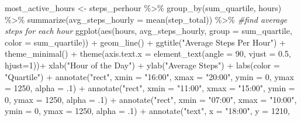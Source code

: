 \documentclass[
]{article}
\newenvironment{Shaded}{\begin{snugshade}}{\end{snugshade}}
\newcommand{\AttributeTok}[1]{\textcolor[rgb]{0.77,0.63,0.00}{#1}}
\newcommand{\CommentTok}[1]{\textcolor[rgb]{0.56,0.35,0.01}{\textit{#1}}}
\newcommand{\DecValTok}[1]{\textcolor[rgb]{0.00,0.00,0.81}{#1}}
\newcommand{\FloatTok}[1]{\textcolor[rgb]{0.00,0.00,0.81}{#1}}
\newcommand{\FunctionTok}[1]{\textcolor[rgb]{0.00,0.00,0.00}{#1}}
\newcommand{\NormalTok}[1]{#1}
\newcommand{\OtherTok}[1]{\textcolor[rgb]{0.56,0.35,0.01}{#1}}
\newcommand{\SpecialCharTok}[1]{\textcolor[rgb]{0.00,0.00,0.00}{#1}}
\newcommand{\StringTok}[1]{\textcolor[rgb]{0.31,0.60,0.02}{#1}}
\begin{document}
\begin{Shaded}
\begin{Highlighting}[]
\NormalTok{ most\_active\_hours }\OtherTok{\textless{}{-}}\NormalTok{  steps\_perhour }\SpecialCharTok{\%\textgreater{}\%}
   \FunctionTok{group\_by}\NormalTok{(sum\_quartile, hours) }\SpecialCharTok{\%\textgreater{}\%}
   \FunctionTok{summarize}\NormalTok{(}\AttributeTok{avg\_steps\_hourly =} \FunctionTok{mean}\NormalTok{(step\_total)) }\SpecialCharTok{\%\textgreater{}\%} \CommentTok{\#find average steps for each hour}
   \FunctionTok{ggplot}\NormalTok{(}\FunctionTok{aes}\NormalTok{(hours, avg\_steps\_hourly, }\AttributeTok{group =}\NormalTok{ sum\_quartile, }\AttributeTok{color =}\NormalTok{ sum\_quartile)) }\SpecialCharTok{+}
   \FunctionTok{geom\_line}\NormalTok{() }\SpecialCharTok{+}
   \FunctionTok{ggtitle}\NormalTok{(}\StringTok{"Average Steps Per Hour"}\NormalTok{) }\SpecialCharTok{+}
   \FunctionTok{theme\_minimal}\NormalTok{() }\SpecialCharTok{+}
   \FunctionTok{theme}\NormalTok{(}\AttributeTok{axis.text.x =} \FunctionTok{element\_text}\NormalTok{(}\AttributeTok{angle =} \DecValTok{90}\NormalTok{, }\AttributeTok{vjust =} \FloatTok{0.5}\NormalTok{, }\AttributeTok{hjust=}\DecValTok{1}\NormalTok{))}\SpecialCharTok{+}
   \FunctionTok{xlab}\NormalTok{(}\StringTok{"Hour of the Day"}\NormalTok{) }\SpecialCharTok{+} \FunctionTok{ylab}\NormalTok{(}\StringTok{"Average Steps"}\NormalTok{) }\SpecialCharTok{+}
   \FunctionTok{labs}\NormalTok{(}\AttributeTok{color =} \StringTok{"Quartile"}\NormalTok{) }\SpecialCharTok{+}
   \FunctionTok{annotate}\NormalTok{(}\StringTok{"rect"}\NormalTok{, }\AttributeTok{xmin =} \StringTok{"16:00"}\NormalTok{, }\AttributeTok{xmax =} \StringTok{"20:00"}\NormalTok{, }
            \AttributeTok{ymin =} \DecValTok{0}\NormalTok{, }\AttributeTok{ymax =} \DecValTok{1250}\NormalTok{, }\AttributeTok{alpha =}\NormalTok{ .}\DecValTok{1}\NormalTok{) }\SpecialCharTok{+}
   \FunctionTok{annotate}\NormalTok{(}\StringTok{"rect"}\NormalTok{, }\AttributeTok{xmin =} \StringTok{"11:00"}\NormalTok{, }\AttributeTok{xmax =} \StringTok{"15:00"}\NormalTok{, }
            \AttributeTok{ymin =} \DecValTok{0}\NormalTok{, }\AttributeTok{ymax =} \DecValTok{1250}\NormalTok{, }\AttributeTok{alpha =}\NormalTok{ .}\DecValTok{1}\NormalTok{) }\SpecialCharTok{+}
   \FunctionTok{annotate}\NormalTok{(}\StringTok{"rect"}\NormalTok{, }\AttributeTok{xmin =} \StringTok{"07:00"}\NormalTok{, }\AttributeTok{xmax =} \StringTok{"10:00"}\NormalTok{, }
            \AttributeTok{ymin =} \DecValTok{0}\NormalTok{, }\AttributeTok{ymax =} \DecValTok{1250}\NormalTok{, }\AttributeTok{alpha =}\NormalTok{ .}\DecValTok{1}\NormalTok{) }\SpecialCharTok{+}
   \FunctionTok{annotate}\NormalTok{(}\StringTok{"text"}\NormalTok{, }\AttributeTok{x =} \StringTok{"18:00"}\NormalTok{, }\AttributeTok{y =} \DecValTok{1210}\NormalTok{, }

\end{Highlighting}
\end{Shaded}
\end{document}
